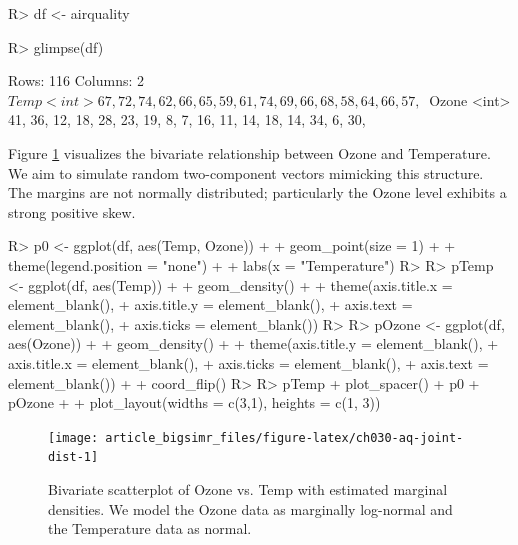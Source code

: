 \documentclass[
]{jss}
\begin{document}
\begin{CodeChunk}
\begin{CodeInput}
R> df <- airquality %
\end{CodeInput}
\end{CodeChunk}

\begin{CodeChunk}
\begin{CodeInput}
R> glimpse(df)
\end{CodeInput}
\begin{CodeOutput}
Rows: 116
Columns: 2
$ Temp  <int> 67, 72, 74, 62, 66, 65, 59, 61, 74, 69, 66, 68, 58, 64, 66, 57, ~
$ Ozone <int> 41, 36, 12, 18, 28, 23, 19, 8, 7, 16, 11, 14, 18, 14, 34, 6, 30,~
\end{CodeOutput}
\end{CodeChunk}

Figure \ref{fig:ch030-aq-joint-dist} visualizes the bivariate relationship between Ozone and Temperature. We aim to simulate random two-component vectors mimicking this structure. The margins are not normally distributed; particularly the Ozone level exhibits a strong positive skew.

\begin{CodeChunk}
\begin{CodeInput}
R> p0 <- ggplot(df, aes(Temp, Ozone)) +
+   geom_point(size = 1) +
+   theme(legend.position = "none") + 
+   labs(x = "Temperature")
R> 
R> pTemp <- ggplot(df, aes(Temp)) + 
+   geom_density() +
+   theme(axis.title.x = element_blank(),
+         axis.title.y = element_blank(),
+         axis.text = element_blank(),
+         axis.ticks = element_blank())
R> 
R> pOzone <- ggplot(df, aes(Ozone)) + 
+     geom_density() +
+   theme(axis.title.y = element_blank(),
+         axis.title.x = element_blank(),
+         axis.ticks = element_blank(),
+         axis.text = element_blank()) +
+   coord_flip()
R> 
R> pTemp + plot_spacer() + p0 + pOzone + 
+   plot_layout(widths = c(3,1), heights = c(1, 3)) 
\end{CodeInput}
\begin{figure}

{\centering \texttt{[image: article\_bigsimr\_files/figure-latex/ch030-aq-joint-dist-1]} 

}

\caption[Bivariate scatterplot of Ozone vs]{Bivariate scatterplot of Ozone vs. Temp with estimated marginal densities. We model the Ozone data as marginally log-normal and the Temperature data as normal.}\label{fig:ch030-aq-joint-dist}
\end{figure}
\end{CodeChunk}
\end{document}
